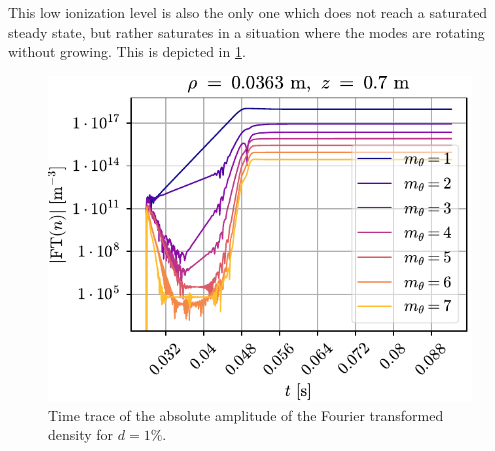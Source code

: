 This low ionization level is also the only one which does not reach a saturated steady state, but rather saturates in a situation where the modes are rotating without growing.
This is depicted in \cref{fig:FFTnn1pct}.
%
\begin{figure}[htb]
    \centering
    \includegraphics{fig/results/neutral/FFTnn1pct}
    \caption{Time trace of the absolute amplitude of the Fourier transformed density for $d=1\%$.}
    \label{fig:FFTnn1pct}
\end{figure}
%


